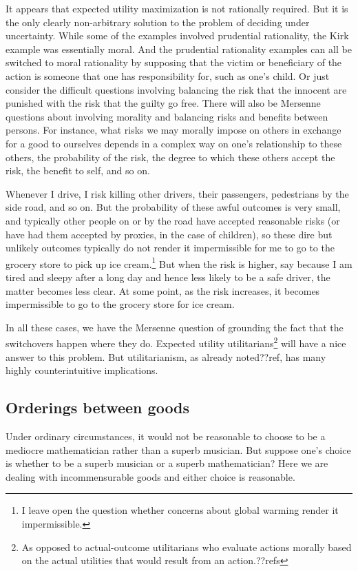 It appears that expected utility maximization is not rationally required. But it is the only clearly non-arbitrary solution
to the problem of deciding under uncertainty. While some of the examples involved prudential rationality, the Kirk example
was essentially moral. And the prudential rationality examples can all be switched to moral rationality by supposing
that the victim or beneficiary of the action is someone that one has responsibility for, such as one's child.
Or just consider the difficult questions involving balancing the risk that the innocent are punished with 
the risk that the guilty go free.
There will also be Mersenne questions about involving morality and balancing risks and benefits between persons.
For instance, what risks we may morally impose on others in exchange for a good to ourselves depends in a complex way 
on one's relationship to these others, the probability of the risk, the degree to which these others accept the risk, the 
benefit to self, and so on. 

Whenever I drive, I risk killing other drivers, their passengers, pedestrians by the side road, and so on.
But the probability of these awful outcomes is very small, and typically other people on or by the road have accepted reasonable
risks (or have had them accepted by proxies, in the case of children), so these dire but unlikely outcomes typically do not render it impermissible for
me to go to the grocery store to pick up ice cream.\footnote{I leave open the question whether concerns about global warming 
render it impermissible.} But when the risk is higher, say because I am tired and sleepy after a long day and hence less likely to be
a safe driver, the matter becomes less clear. At some point, as the risk increases, it becomes impermissible to go to the grocery
store for ice cream. 

In all these cases, we have the Mersenne question of grounding the fact that the switchovers happen where they do.
Expected utility utilitarians\footnote{As opposed to actual-outcome utilitarians who evaluate actions morally based on the
actual utilities that would result from an action.??refs} will have a nice answer to this problem. But utilitarianism, as already
noted??ref, has many highly counterintuitive implications. 

\subsection{Orderings between goods}
Under ordinary circumstances, it would not be reasonable to choose to be a mediocre mathematician rather than a superb musician. 
But suppose one's choice is whether to be a superb
musician or a superb mathematician? Here we are dealing with incommensurable goods and either choice is reasonable.

